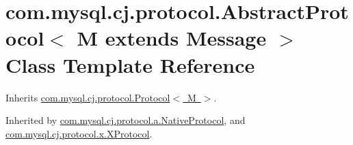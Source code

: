 \hypertarget{classcom_1_1mysql_1_1cj_1_1protocol_1_1_abstract_protocol}{}\section{com.\+mysql.\+cj.\+protocol.\+Abstract\+Protocol$<$ M extends Message $>$ Class Template Reference}
\label{classcom_1_1mysql_1_1cj_1_1protocol_1_1_abstract_protocol}


Inherits \mbox{\hyperlink{interfacecom_1_1mysql_1_1cj_1_1protocol_1_1_protocol}{com.\+mysql.\+cj.\+protocol.\+Protocol$<$ M $>$}}.



Inherited by \mbox{\hyperlink{classcom_1_1mysql_1_1cj_1_1protocol_1_1a_1_1_native_protocol}{com.\+mysql.\+cj.\+protocol.\+a.\+Native\+Protocol}}, and \mbox{\hyperlink{classcom_1_1mysql_1_1cj_1_1protocol_1_1x_1_1_x_protocol}{com.\+mysql.\+cj.\+protocol.\+x.\+X\+Protocol}}.

